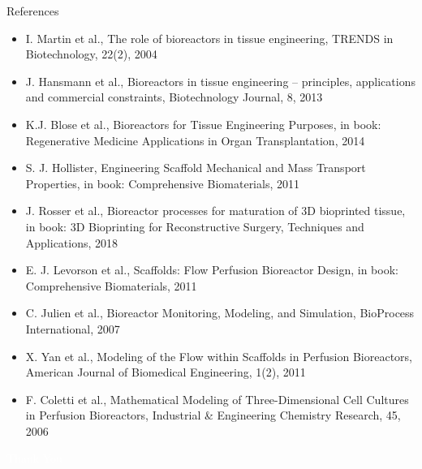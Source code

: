 \documentclass[11pt,t]{beamer}
\begin{document}
\begin{frame}[plain]{References}  

\footnotesize			
\begin{itemize}
\item
I. Martin et al., The role of bioreactors in tissue
engineering, TRENDS in Biotechnology, 22(2), 2004
\item
J. Hansmann et al., Bioreactors in tissue engineering –
principles, applications and commercial constraints, Biotechnology Journal, 8, 2013
\item
K.J. Blose et al., Bioreactors for Tissue Engineering
Purposes, in book: Regenerative Medicine Applications in Organ Transplantation, 2014
\item
S. J. Hollister, Engineering Scaffold Mechanical and Mass Transport Properties, in book: Comprehensive Biomaterials, 2011
\item
J. Rosser et al., Bioreactor processes for maturation of 3D bioprinted tissue, in book: 3D Bioprinting for Reconstructive Surgery, Techniques and Applications, 2018
\item
E. J. Levorson et al., Scaffolds: Flow Perfusion Bioreactor Design, in book: Comprehensive Biomaterials, 2011
\item
C. Julien et al., Bioreactor Monitoring, Modeling, and Simulation, BioProcess International, 2007
\item
X. Yan et al., Modeling of the Flow within Scaffolds in Perfusion Bioreactors, American Journal of Biomedical Engineering, 1(2), 2011
\item
F. Coletti et al., Mathematical Modeling of Three-Dimensional Cell Cultures in Perfusion Bioreactors, Industrial \& Engineering Chemistry Research, 45, 2006
\end{itemize}

\end{frame}

\begin{frame}

\centering
\textcolor{white}{\huge Thank You}
\end{frame}
\end{document}
